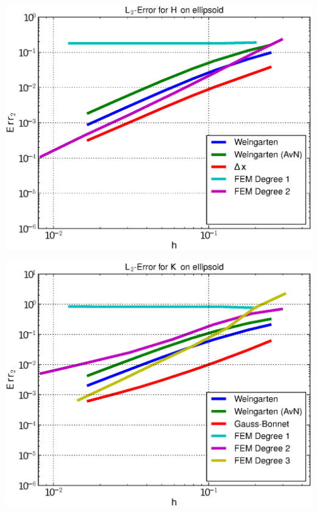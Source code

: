\documentclass{beamer}
\begin{document}
\begin{frame}
\begin{overprint}
\begin{minipage}[t]{0.49\textwidth}
            \centering\includegraphics[width=\textwidth]{bilder/Curvature/heineC/ErrHL2_5.eps}
          \end{minipage}
          \begin{minipage}[t]{0.49\textwidth}
            \centering\includegraphics[width=\textwidth]{bilder/Curvature/heineC/ErrKL2_6.eps}
          \end{minipage}\hfill
          \begin{minipage}[t]{0.49\textwidth}

\end{minipage}
\end{overprint}
\end{frame}
\end{document}
